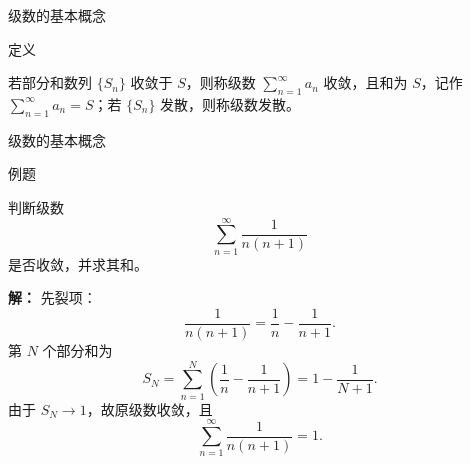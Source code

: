 \documentclass[aspectratio=169,10pt,fontset=fandol]{ctexbeamer}
\newenvironment{custom}[1]{\par\noindent\textbf{#1}\quad}{\par\vspace{0.8em}}
\begin{document}
\begin{frame}[t,fragile]{级数的基本概念}
\small
\begin{block}{定义}
{\small

若部分和数列 \(\{S_n\}\) 收敛于 \(S\)，则称级数 \(\sum\limits_{n = 1}^{  \infty } a_n\) 收敛，且和为 \(S\)，记作 \(\sum\limits_{n = 1}^{  \infty } a_n = S\)；若 \(\{S_n\}\) 发散，则称级数发散。

}
\end{block}
\end{frame}
\begin{frame}[t,fragile]{级数的基本概念}
\small
\begin{block}{例题}
{\small
判断级数
\[
\sum_{n=1}^{\infty}\frac{1}{n(n+1)}
\]
是否收敛，并求其和。

}
\end{block}
\pause
{\small
\textbf{解：}
先裂项：
\[
\frac{1}{n(n+1)}=\frac1n-\frac{1}{n+1}.
\]
第 $N$ 个部分和为
\[
S_N=\sum_{n=1}^{N}\left(\frac1n-\frac{1}{n+1}\right)
=1-\frac{1}{N+1}.
\]
由于 $S_N\to1$，故原级数收敛，且
\[
\sum_{n=1}^{\infty}\frac{1}{n(n+1)}=1.
\]

}
\end{frame}
\end{document}
